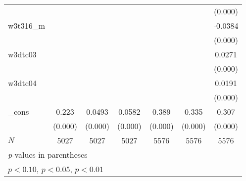 {\begin{tabular}{l*{6}{c}}
            &                     &                     &                     &                     &                     &     (0.000)         \\
[1em]
w3t316\_m    &                     &                     &                     &                     &                     &     -0.0384\sym{***}\\
            &                     &                     &                     &                     &                     &     (0.000)         \\
[1em]
w3dtc03     &                     &                     &                     &                     &                     &      0.0271\sym{***}\\
            &                     &                     &                     &                     &                     &     (0.000)         \\
[1em]
w3dtc04     &                     &                     &                     &                     &                     &      0.0191\sym{***}\\
            &                     &                     &                     &                     &                     &     (0.000)         \\
[1em]
\_cons      &       0.223\sym{***}&      0.0493\sym{***}&      0.0582\sym{***}&       0.389\sym{***}&       0.335\sym{***}&       0.307\sym{***}\\
            &     (0.000)         &     (0.000)         &     (0.000)         &     (0.000)         &     (0.000)         &     (0.000)         \\
\hline
\(N\)       &        5027         &        5027         &        5027         &        5576         &        5576         &        5576         \\
\hline\hline
\multicolumn{7}{l}{\footnotesize \textit{p}-values in parentheses}\\
\multicolumn{7}{l}{\footnotesize \sym{*} \(p<0.10\), \sym{**} \(p<0.05\), \sym{***} \(p<0.01\)}\\
\end{tabular}
}
